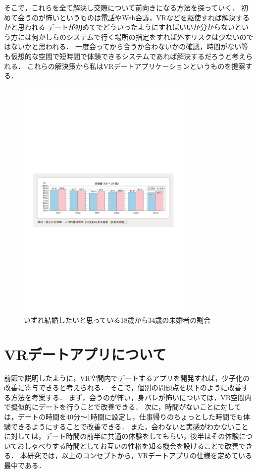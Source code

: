 \documentclass[12pt]{ltjsarticle}
\begin{document}
そこで，これらを全て解決し交際について前向きになる方法を探っていく．
初めて会うのが怖いというものは電話やWeb会議，VRなどを駆使すれば解決するかと思われる
デートが初めてでどういったようにすればいいか分からないという方には何かしらのシステムで行く場所の指定をすれば外すリスクは少ないのではないかと思われる．
一度会ってから合うか合わないかの確認，時間がない\cite{chou2014}等も仮想的な空間で短時間で体験できるシステムであれば解決するだろうと考えられる．
これらの解決策から私はVRデートアプリケーションというものを提案する．
\begin{figure}[h]
\centering
 \includegraphics[width=85mm]{iyoku.jpg.pdf}
 \caption{いずれ結婚したいと思っている18歳から34歳の未婚者の割合}
 \label{fig:教科書}
\end{figure}

\section{VRデートアプリについて}
前節で説明したように，VR空間内でデートするアプリを開発すれば，少子化の改善に寄与できると考えられる．
そこで，個別の問題点を以下のように改善する方法を考案する．
まず，会うのが怖い，身バレが怖いについては，VR空間内で擬似的にデートを行うことで改善できる．
次に，時間がないことに対しては，デートの時間を40分〜1時間に設定し，仕事帰りのちょっとした時間でも体験できるようにすることで改善できる．
また，会わないと実感がわかないことに対しては，デート時間の前半に共通の体験をしてもらい，後半はその体験についておしゃべりする時間としてお互いの性格を知る機会を設けることで改善できる．
本研究では，以上のコンセプトから，VRデートアプリの仕様を定めている最中である．
\end{document}
